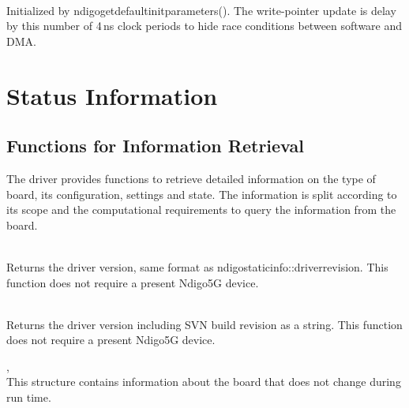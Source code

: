             \begin{description}
                \item[] 
                \item[] 
                \item[] 
            \end{description}

            \\
            Initialized by \textsf{ndigo\tu get\tu default\tu init\tu parameters()}. The write-pointer update is delay by this number of 4\,ns clock periods to hide race conditions between software and DMA.

    \clearpage
    \section{Status Information}
        \subsection{Functions for Information Retrieval}

            The driver provides functions to retrieve detailed information on the type of board, its configuration, settings and state. The information is split according to its scope and the computational requirements to query the information from the board.\par

            \\
            Returns the driver version, same format as ndigo\tu static\tu info::driver\tu revision. This function does not require a
            present Ndigo5G device.

            \\
            Returns the driver version including SVN build revision as a string. This function does not require a
            present Ndigo5G device.

            ,\\
            This structure contains information about the board that does not change during run time.\par

